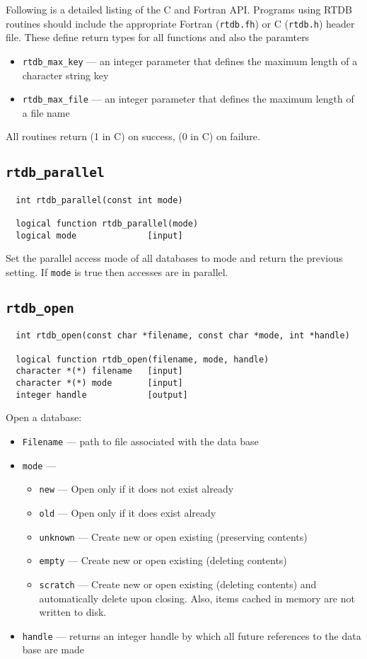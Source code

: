 Following is a detailed listing of the C and Fortran API\@.  
Programs using RTDB routines should include the appropriate Fortran
({\tt rtdb.fh}) or C ({\tt rtdb.h}) header file.   These define return
types for all functions and also the paramters 
\begin{itemize}
\item {\tt rtdb\_max\_key} --- an integer parameter that defines the maximum
  length of a character string key
\item {\tt rtdb\_max\_file} --- an integer parameter that defines the maximum
  length of a file name
\end{itemize}
All routines return \TRUE (1 in C) on success, \FALSE (0
in C) on failure.

\subsection{{\tt rtdb\_parallel}}
\begin{verbatim}
  int rtdb_parallel(const int mode)

  logical function rtdb_parallel(mode)
  logical mode              [input]
\end{verbatim}
Set the parallel access mode of all databases to mode and return the
previous setting. If {\tt mode} is true then accesses are in parallel.

\subsection{{\tt rtdb\_open}}
\begin{verbatim}
  int rtdb_open(const char *filename, const char *mode, int *handle)

  logical function rtdb_open(filename, mode, handle)
  character *(*) filename   [input]
  character *(*) mode       [input]
  integer handle            [output]
\end{verbatim}
Open a database:
\begin{itemize}
\item    {\tt Filename} --- path to file associated with the data base
\item    {\tt mode} ---
\begin{itemize}
\item {\tt new} ---  Open only if it does not exist already
\item {\tt old} ---  Open only if it does exist already
\item {\tt unknown} --- Create new or open existing (preserving contents)
\item {\tt empty} --- Create new or open existing (deleting contents)
\item {\tt scratch} --- Create new or open existing (deleting contents)
                         and automatically delete upon closing.  Also, items
                         cached in memory are not written to disk.
\end{itemize}
\item {\tt handle} --- returns an integer handle by which all future
  references to the data base are made
\end{itemize}

